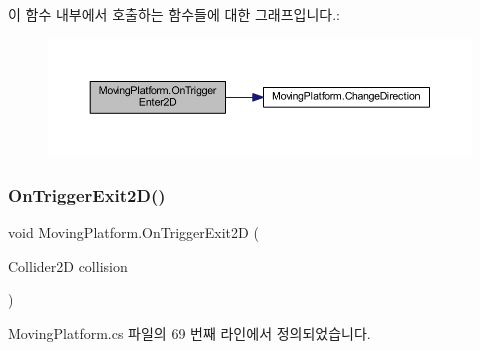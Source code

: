 \begin{DoxyCode}{0}

\end{DoxyCode}
이 함수 내부에서 호출하는 함수들에 대한 그래프입니다.\+:\nopagebreak
\begin{figure}[H]
\begin{center}
\leavevmode
\includegraphics[width=350pt]{df/d42/class_moving_platform_ad9ff97c68ae6e8dbf202009afcd139ce_cgraph}
\end{center}
\end{figure}
\mbox{\label{class_moving_platform_aef43c6c16b01647d14cfc0a2c9710729}} 
\subsubsection{\texorpdfstring{OnTriggerExit2D()}{OnTriggerExit2D()}}
{\footnotesize\ttfamily void Moving\+Platform.\+On\+Trigger\+Exit2D (\begin{DoxyParamCaption}\item[{Collider2D}]{collision }\end{DoxyParamCaption})\hspace{0.3cm}{\ttfamily [private]}}



Moving\+Platform.\+cs 파일의 69 번째 라인에서 정의되었습니다.


